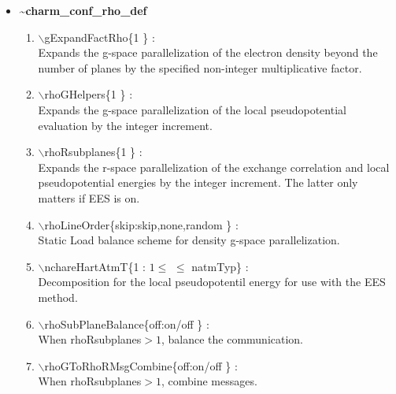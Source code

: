 \documentclass[12pt]{article}
\begin{document}
\begin{itemize}
\clearpage
\huge
\item[] {\bf \~{ }charm\_conf\_rho\_def}
\begin{enumerate}
  \vspace{0.15in} \Large
  \item $\backslash$gExpandFactRho\{1 \} : \\    \large
  Expands the g-space parallelization of the electron density beyond
  the number of planes by the specified non-integer multiplicative factor. 
  \vspace{0.15in} \Large
  \item $\backslash$rhoGHelpers\{1 \} : \\    \large
  Expands the g-space parallelization of the local pseudopotential
  evaluation by the integer increment.
  \vspace{0.15in} \Large
  \item $\backslash$rhoRsubplanes\{1 \} : \\    \large
  Expands the r-space parallelization of the exchange correlation and 
  local pseudopotential energies by the integer increment. 
  The latter only matters if EES is on.
  \vspace{0.15in} \Large
  \item $\backslash$rhoLineOrder\{skip:skip,none,random \} : \\    \large
  Static Load balance scheme for density g-space parallelization.
  \vspace{0.15in} \Large
  \item $\backslash$nchareHartAtmT\{1 : $1 \leq$ $\leq$ natmTyp\} : \\ \large
  Decomposition for the local pseudopotentil energy for use with the 
  EES method.
  \vspace{0.15in} \Large
  \item $\backslash$rhoSubPlaneBalance\{off:on/off \} : \\    \large
  When rhoRsubplanes$>1$, balance the communication.
  \vspace{0.15in} \Large
  \item $\backslash$rhoGToRhoRMsgCombine\{off:on/off \} : \\    \large
  When rhoRsubplanes$>1$, combine messages.
\end{enumerate}


\end{itemize}
\end{document}
